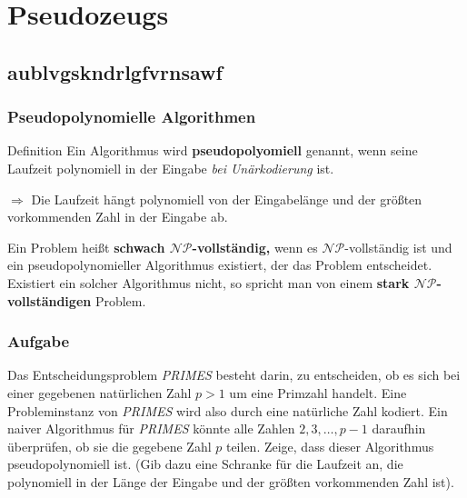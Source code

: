 \section{Pseudozeugs}
\subsection{aublvgskndrlgfvrnsawf}
\begin{frame}
\frametitle{Pseudopolynomielle Algorithmen}
\begin{block}{Definition}
Ein Algorithmus wird \textbf{pseudopolyomiell} genannt, wenn seine Laufzeit polynomiell in der Eingabe \textit{bei Unärkodierung} ist.
\end{block}

$\Rightarrow$ Die Laufzeit hängt polynomiell von der Eingabelänge und der größten vorkommenden Zahl in der Eingabe ab. \micropause

Ein Problem heißt \textbf{schwach $\mathcal{NP}$-vollständig,} wenn es $\mathcal{NP}$-vollständig ist und ein pseudopolynomieller Algorithmus existiert, der das Problem entscheidet.\micropause
Existiert ein solcher Algorithmus nicht, so spricht man von einem \textbf{stark $\mathcal{NP}$-vollständigen} Problem.
\end{frame}

\begin{frame}
\frametitle{Aufgabe}
Das Entscheidungsproblem \textit{PRIMES} besteht darin, zu entscheiden, ob es sich bei einer gegebenen natürlichen Zahl $p>1$ um eine Primzahl handelt. 
Eine Probleminstanz von \textit{PRIMES} wird also durch eine natürliche Zahl kodiert.  \micropause
Ein naiver Algorithmus für \textit{PRIMES} könnte alle Zahlen $2,3,\ldots,p-1$ daraufhin überprüfen, ob sie die gegebene Zahl $p$ teilen.  \micropause
Zeige, dass dieser Algorithmus pseudopolynomiell ist. 
(Gib dazu eine Schranke für die Laufzeit an, die polynomiell in der Länge der Eingabe und der größten vorkommenden Zahl ist).
\end{frame}


